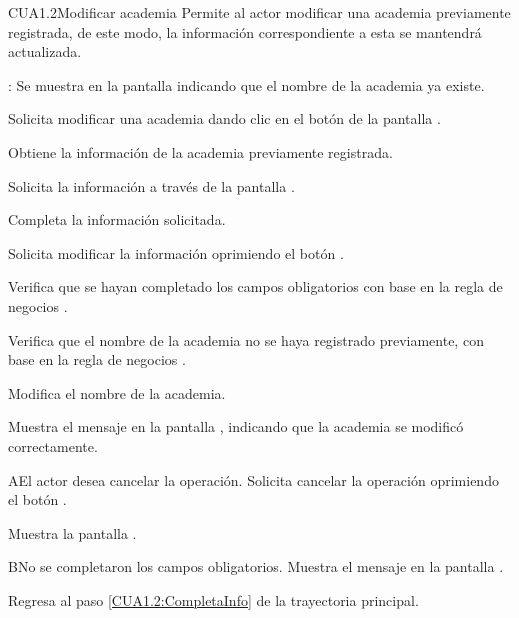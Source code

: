 \begin{UseCase}{CUA1.2}{Modificar academia}{	
	Permite al actor modificar una academia previamente registrada, de este modo, la información correspondiente a esta se mantendrá actualizada.
}
{\begin{UClist}
			\UCli {}: Se muestra en la pantalla  indicando que el nombre de la academia ya existe.
			
		\end{UClist}
	}
\end{UseCase}

\begin{UCtrayectoria}
	\UCpaso [\UCactor] Solicita modificar una academia dando clic en el botón 
	de la pantalla . 
		
	\UCpaso [\UCsist] Obtiene la información de la academia previamente registrada.

	\UCpaso[\UCsist] Solicita la información a través de la pantalla .
	
	\UCpaso [\UCactor] Completa la información solicitada. \label{CUA1.2:CompletaInfo}
	
	\UCpaso [\UCactor] Solicita modificar la información oprimiendo el botón . 
	
	\UCpaso [\UCsist] Verifica que se hayan completado los campos obligatorios con base en la regla de negocios . 
	
	\UCpaso [\UCsist] Verifica que el nombre de la academia no se haya registrado previamente, con base en la regla de negocios . 
		
	\UCpaso [\UCsist] Modifica el nombre de la academia.
	
	\UCpaso [\UCsist] Muestra el mensaje  en la pantalla , indicando que la academia se modificó correctamente.	
	
\end{UCtrayectoria}



\begin{UCtrayectoriaA}{A}{El actor desea cancelar la operación.}
	\UCpaso [\UCactor] Solicita cancelar la operación oprimiendo el botón .
	
	\UCpaso [\UCsist] Muestra la pantalla . 
\end{UCtrayectoriaA}

\begin{UCtrayectoriaA}{B}{No se completaron los campos obligatorios.}
	\UCpaso [\UCsist] Muestra el mensaje  en la pantalla .
	
	\UCpaso Regresa al paso \ref{CUA1.2:CompletaInfo} de la trayectoria principal.
\end{UCtrayectoriaA}

